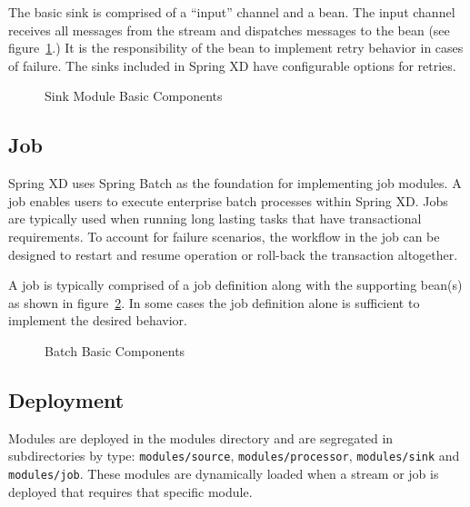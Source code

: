 \par

The basic sink is comprised of a ``input'' channel and a bean.
The input channel receives all messages from the stream and dispatches
messages to the bean (see figure~\ref{fig:sinkmbc}.) It is the responsibility 
of the bean to implement retry behavior in cases of failure. The sinks 
included in Spring XD have configurable options for retries.

\par

\begin{figure}
\centering
{}
\caption{Sink Module Basic Components}
\label{fig:sinkmbc}
\end{figure}

\par

\subsection{Job}
Spring XD uses Spring Batch \cite{spring-batch-reference} as the foundation for implementing
job modules. A job enables users to execute enterprise batch processes within Spring XD.
Jobs are typically used when running long lasting tasks that have transactional requirements.
To account for failure scenarios, the workflow in the job can be designed to restart and 
resume operation or roll-back the transaction altogether.

\par

A job is typically comprised of a job definition along with the supporting
bean(s) as shown in figure~\ref{fig:batchmbc}.
In some cases the job definition alone is sufficient to implement the desired behavior.

\par

\begin{figure}
\centering
{}
\caption{Batch Basic Components}
\label{fig:batchmbc}
\end{figure}

\par 

\subsection{Deployment}
Modules are deployed in the modules directory and are segregated in
subdirectories by type: \texttt{modules/source}, \texttt{modules/processor}, 
\texttt{modules/sink} and \texttt{modules/job}.
These modules are dynamically loaded when a stream or job is deployed that requires that
specific module.

